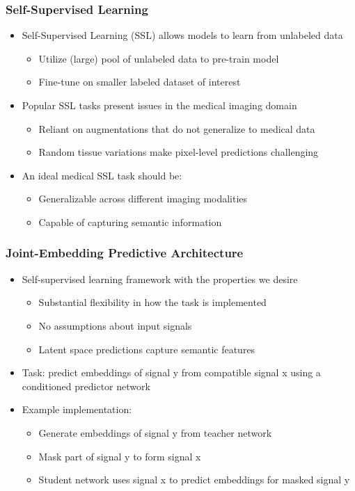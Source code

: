 \documentclass[12pt]{beamer}
\begin{document}
\begin{frame}
\frametitle{Self-Supervised Learning}
\begin{itemize}
    \item Self-Supervised Learning (SSL) allows models to learn from unlabeled data
    \begin{itemize}
        \item Utilize (large) pool of unlabeled data to pre-train model
        \item Fine-tune on smaller labeled dataset of interest
    \end{itemize}
    \item Popular SSL tasks present issues in the medical imaging domain
    \begin{itemize}
        \item Reliant on augmentations that do not generalize to medical data
        \item Random tissue variations make pixel-level predictions challenging
    \end{itemize}
    \item An ideal medical SSL task should be:
    \begin{itemize}
        \item Generalizable across different imaging modalities
        \item Capable of capturing semantic information
    \end{itemize}
\end{itemize}
\end{frame}

\begin{frame}
\frametitle{Joint-Embedding Predictive Architecture \supercite{lecun2022path}}
\begin{itemize}
    \item Self-supervised learning framework with the properties we desire
    \begin{itemize}
        \item Substantial flexibility in how the task is implemented
        \item No assumptions about input signals
        \item Latent space predictions capture semantic features
    \end{itemize}
    \item Task: predict embeddings of signal y from compatible signal x using a conditioned predictor network
    \item Example implementation:
    \begin{itemize}
        \item Generate embeddings of signal y from teacher network
        \item Mask part of signal y to form signal x
        \item Student network uses signal x to predict embeddings for masked signal y
    \end{itemize}
\end{itemize}
\end{frame}
\end{document}

